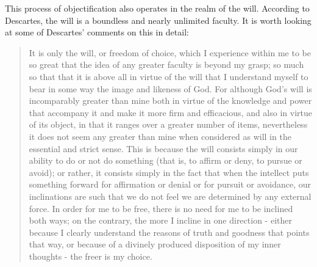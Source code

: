 \documentclass[phd,12pt,oneside,paper=letterpaper]{ubcthesis}
\begin{document}
This process of objectification also operates in the realm of the will. According to Descartes, the will is a boundless and nearly unlimited faculty. It is worth looking at some of Descartes' comments on this in detail:

\begin{quote}
It is only the will, or freedom of choice, which I experience within me to be so great that the idea of any greater faculty is beyond my grasp; so much so that that it is above all in virtue of the will that I understand myself to bear in some way the image and likeness of God. For although God's will is incomparably greater than mine both in virtue of the knowledge and power that accompany it and make it more firm and efficacious, and also in virtue of its object, in that it ranges over a greater number of items, nevertheless it does not seem any greater than mine when considered as will in the essential and strict sense. This is because the will consists simply in our ability to do or not do something (that is, to affirm or deny, to pursue or avoid); or rather, it consists simply in the fact that when the intellect puts something forward for affirmation or denial or for pursuit or avoidance, our inclinations are such that we do not feel we are determined by any external force. In order for me to be free, there is no need for me to be inclined both ways; on the contrary, the more I incline in one direction - either because I clearly understand the reasons of truth and goodness that points that way, or because of a divinely produced disposition of my inner thoughts - the freer is my choice. \citep[p.40]{descartes1984c}
\end{quote}
\end{document}

